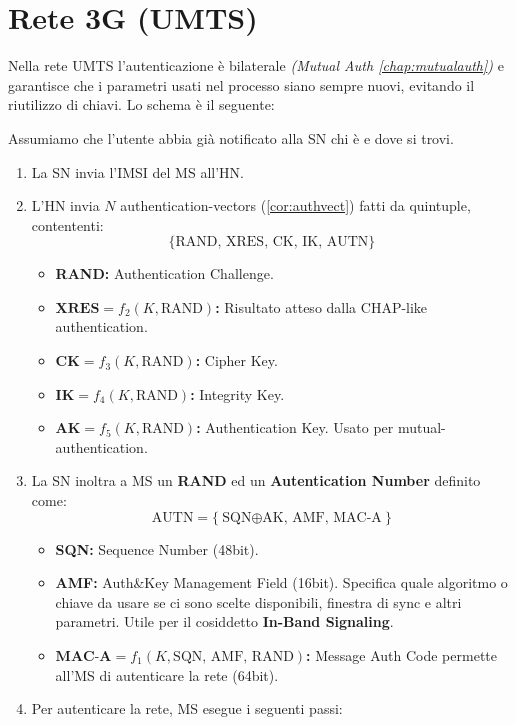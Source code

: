 \section{Rete 3G (UMTS)}
Nella rete UMTS l'autenticazione è bilaterale \textit{(Mutual Auth \cref{chap:mutualauth})} e garantisce che i parametri usati nel processo siano sempre nuovi, evitando il riutilizzo di chiavi. Lo schema è il seguente:
\begin{proposition}\label{prop:3gauth}
Assumiamo che l'utente abbia già notificato alla SN chi è e dove si trovi.
\begin{enumerate}
    \item La SN invia l'IMSI del MS all'HN.
    \item\label{authvect5} L'HN invia $N$ authentication-vectors (\cref{cor:authvect}) fatti da quintuple, contententi:
    \[\{\text{RAND, XRES, CK, IK, AUTN}\}\]
    \begin{itemize}
        \item \textbf{RAND:} Authentication Challenge.
        \item $\textbf{XRES}=f_2(K,\text{RAND})$\textbf{:} Risultato atteso dalla CHAP-like authentication.
        \item $\textbf{CK}=f_3(K,\text{RAND})$\textbf{:} Cipher Key.
        \item $\textbf{IK}=f_4(K,\text{RAND})$\textbf{:} Integrity Key.
        \item $\textbf{AK}=f_5(K,\text{RAND})$\textbf{:} Authentication Key. Usato per mutual-authentication.
    \end{itemize}
    \item La SN inoltra a MS un \textbf{RAND} ed un \textbf{Autentication Number} definito come:
    \[\text{AUTN}=\{\text{SQN$\oplus$AK, AMF, MAC-A}\}\]
    \begin{itemize}
        \item \textbf{SQN:} Sequence Number (48bit).
        \item \textbf{AMF:} Auth\&Key Management Field (16bit). Specifica quale algoritmo o chiave da usare se ci sono scelte disponibili, finestra di sync e altri parametri. Utile per il cosiddetto \textbf{In-Band Signaling}.
        \item $\textbf{MAC-A}=f_1(K,\text{SQN, AMF, RAND})$\textbf{:} Message Auth Code permette all'MS di autenticare la rete (64bit).
    \end{itemize}
    \item Per autenticare la rete, MS esegue i seguenti passi:

\end{enumerate}
\end{proposition}
